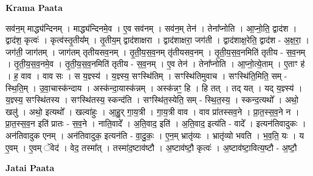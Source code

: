 \documentclass[17pt]{extarticle}
\begin{document}
\textbf{Krama Paata} \newline

सव॑न॒म् माद्ध्य॑न्दिनम् । माद्ध्य॑न्दिनमे॒व । ए॒व सव॑नम् । सव॑न॒म् तेन॑ । तेना᳚प्नोति । आ॒प्नो॒ति॒ द्वाद॑श । द्वाद॑श॒ कृत्वः॑ । कृत्व॑स्तृ॒तीय᳚म् । तृ॒तीय॒म् द्वाद॑शाक्षरा । द्वाद॑शाक्षरा॒ जग॑ती । द्वाद॑शाक्ष॒रेति॒ द्वाद॑श - अ॒क्ष॒रा॒ । जग॑ती॒ जाग॑तम् । जाग॑तम् तृतीयसव॒नम् । तृ॒ती॒य॒स॒व॒नम् तृ॑तीयसव॒नम् । तृ॒ती॒य॒स॒व॒नमिति॑ तृतीय - स॒व॒नम् । तृ॒ती॒य॒स॒व॒नमे॒व । तृ॒ती॒य॒स॒व॒नमिति॑ तृतीय - स॒व॒नम् । ए॒व तेन॑ । तेना᳚प्नोति । आ॒प्नो॒त्ये॒ताम् । ए॒ताꣳ ह॑ । ह॒ वाव । वाव सः । स य॒ज्ञ्स्य॑ । य॒ज्ञ्स्य॒ सꣳस्थि॑तिम् । सꣳस्थि॑तिमुवाच । सꣳस्थि॑ति॒मिति॒ सम् - स्थि॒ति॒म् । उ॒वा॒चास्क॑न्दाय । अस्क॑न्दा॒यास्क॑न्नम् । अस्क॑न्नꣳ॒॒ हि । हि तत् । तद् यत् । यद् य॒ज्ञ्स्य॑ । य॒ज्ञ्स्य॒ सꣳस्थि॑तस्य । सꣳस्थि॑तस्य॒ स्कन्द॑ति । सꣳस्थि॑त॒स्येति॒ सम् - स्थि॒त॒स्य॒ । स्कन्द॒त्यथो᳚ । अथो॒ खलु॑ । अथो॒ इत्यथो᳚ । खल्वा॑हुः । आ॒हु॒र् गा॒य॒त्री । गा॒य॒त्री वाव । वाव प्रा॑तस्सव॒ने । प्रा॒त॒स्स॒व॒ने न । प्रा॒त॒स्स॒व॒न इति॑ प्रातः - स॒व॒ने । नाति॒वादे᳚ । अ॒ति॒वाद॒ इति॑ । अ॒ति॒वाद॒ इत्य॑ति - वादे᳚ । इत्यन॑तिवादुकः । अन॑तिवादुक एनम् । अन॑तिवादुक॒ इत्यन॑ति - वा॒दु॒कः॒ । ए॒न॒म् भ्रातृ॑व्यः । भ्रातृ॑व्यो भवति । भ॒व॒ति॒ यः । य ए॒वम् । ए॒वम् ॅवेद॑ । वेद॒ तस्मा᳚त् । तस्मा॑द॒ष्टाव॑ष्टौ । अ॒ष्टाव॑ष्टौ॒ कृत्वः॑ । अ॒ष्टाव॑ष्टा॒वित्य॒ष्टौ - अ॒ष्टौ॒ \newline

\textbf{Jatai Paata} \newline
\end{document}
